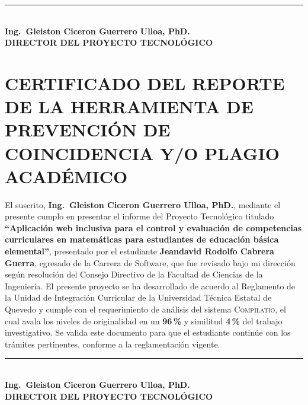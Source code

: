 \documentclass[12pt,a4paper,oneside]{report}
\begin{document}
\vspace{3.5cm}

\begin{center}
\rule{8cm}{0.5pt}\\[0.3cm]
\textbf{Ing.\ Gleiston Ciceron Guerrero Ulloa, PhD.}\\
\textbf{DIRECTOR DEL PROYECTO TECNOLÓGICO}
\end{center}

\clearpage

\chapter*{CERTIFICADO DEL REPORTE DE LA HERRAMIENTA DE PREVENCIÓN DE COINCIDENCIA Y/O PLAGIO ACADÉMICO}

\vspace{0.8cm}

El suscrito, \textbf{Ing.\ Gleiston Ciceron Guerrero Ulloa, PhD.}, mediante el presente cumplo en presentar el informe del Proyecto Tecnológico titulado \textbf{``Aplicación web inclusiva para el control y evaluación de competencias curriculares en matemáticas para estudiantes de educación básica elemental''}, presentado por el estudiante \textbf{Jeandavid Rodolfo Cabrera Guerra}, egresado de la Carrera de Software, que fue revisado bajo mi dirección según resolución del Consejo Directivo de la Facultad de Ciencias de la Ingeniería. El presente proyecto se ha desarrollado de acuerdo al Reglamento de la Unidad de Integración Curricular de la Universidad Técnica Estatal de Quevedo y cumple con el requerimiento de análisis del sistema \textsc{Compilatio}, el cual avala los niveles de originalidad en un \textbf{96\,\%} y similitud \textbf{4\,\%} del trabajo investigativo. Se valida este documento para que el estudiante continúe con los trámites pertinentes, conforme a la reglamentación vigente.

\vspace{2.5cm}

\begin{center}
\rule{8cm}{0.5pt}\\[0.3cm]
\textbf{Ing.\ Gleiston Ciceron Guerrero Ulloa, PhD.}\\
\textbf{DIRECTOR DEL PROYECTO TECNOLÓGICO}
\end{center}
\end{document}
